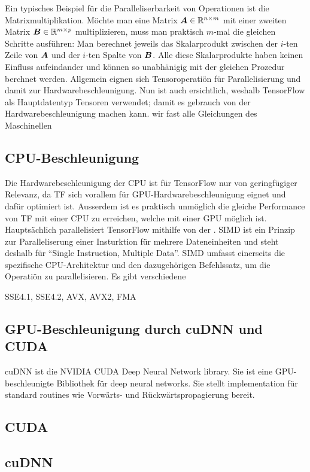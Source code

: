 \begin{appendices}
Ein typisches Beispiel für die Paralleliserbarkeit von Operationen ist die
Matrixmultiplikation. Möchte man eine Matrix $\bm{A} \in \mathbb{R}^{n \times m}$ mit
einer zweiten Matrix $\bm{B} \in \mathbb{R}^{m \times p}$ multiplizieren, muss man
praktisch $m$-mal die gleichen Schritte ausführen: Man berechnet jeweils das
Skalarprodukt zwischen der $i$-ten Zeile von $\bm{A}$ und der $i$-ten Spalte
von $\bm{B}$. Alle diese Skalarprodukte haben keinen Einfluss aufeindander und
können so unabhänigig mit der gleichen Prozedur berchnet werden.
\para{}
Allgemein eignen sich Tensoroperatiön für Parallelisierung und damit zur Hardwarebeschleunigung.
Nun ist auch ersichtlich, weshalb TensorFlow als Hauptdatentyp Tensoren
verwendet; damit es gebrauch von der Hardwarebeschleunigung machen kann. wir fast alle Gleichungen des Maschinellen

\subsection*{CPU-Beschleunigung}
Die Hardwarebeschleunigung der CPU ist für TensorFlow nur von geringfügiger
Relevanz, da TF sich vorallem für GPU-Hardwarebeschleunigung eignet
und dafür optimiert ist. Ausserdem ist es praktisch unmöglich die gleiche
Performance von TF mit einer CPU zu erreichen, welche mit einer GPU möglich ist.
\para{}
Hauptsächlich parallelisiert TensorFlow mithilfe von der . SIMD
ist ein Prinzip zur Paralleliserung einer Insturktion für mehrere
Dateneinheiten und steht deshalb für ``Single Instruction, Multiple Data''.
SIMD umfasst einerseits die spezifische CPU-Architektur und den dazugehörigen
Befehlssatz, um die Operatiön zu parallelisieren.
Es gibt verschiedene

SSE4.1, SSE4.2, AVX, AVX2, FMA

\subsection*{GPU-Beschleunigung durch cuDNN und CUDA}
cuDNN ist die NVIDIA CUDA Deep Neural Network library. Sie ist eine
GPU-beschleunigte Bibliothek für deep neural networks. Sie stellt
implementation für standard routines wie Vorwärts- und Rückwärtspropagierung bereit.

\subsection*{CUDA}
\subsection*{cuDNN}



\end{appendices}
